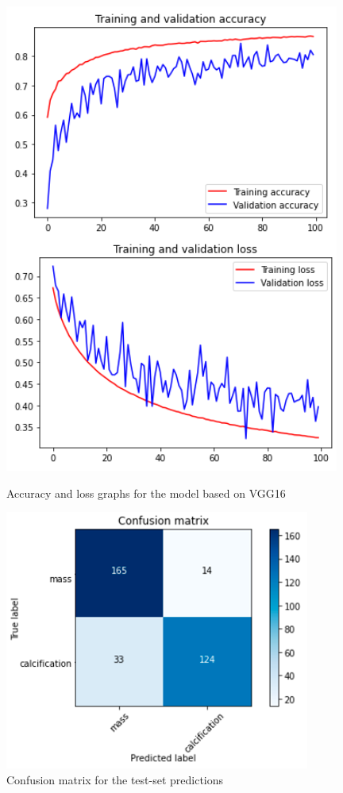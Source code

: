 \documentclass[11pt,a4paper,oneside]{article}
\begin{document}
\begin{figure}[h]
\centering
	\begin{minipage}[c]{.4\textwidth}
		\centering\setlength{\captionmargin}{0pt}%
		\includegraphics[width=.9\textwidth]{images/Task 3/VGG16 3.1/Accuracy}
		\caption{Accuracy and loss graphs for the model based on VGG16}
		\label{fig:vgg16_3.1_accuracy}
	\end{minipage}
	\hspace{5mm}%
	\begin{minipage}[c]{.4\textwidth}
		\centering\setlength{\captionmargin}{0pt}%
		\includegraphics[width=.9\textwidth]{images/Task 3/VGG16 3.1/Conf Matrix}
		\caption{Confusion matrix for the test-set predictions}
		\label{fig:vgg16_3.1_matrix}
	\end{minipage}%
\end{figure}
\end{document}
